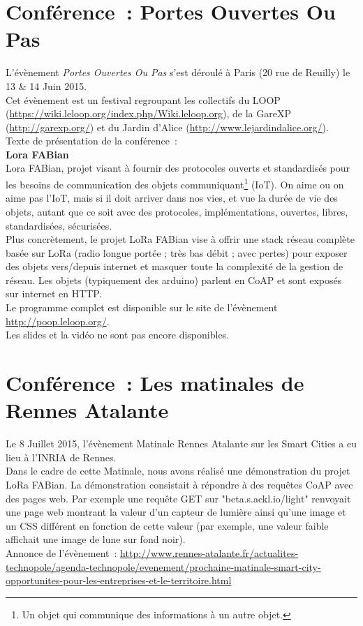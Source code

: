 \documentclass{article}
\begin{document}
	\section{Conférence~: Portes Ouvertes Ou Pas}
L'évènement \emph{Portes Ouvertes Ou Pas} s'est déroulé à Paris (20 rue de Reuilly) le 13 \& 14 Juin 2015.\\
Cet évènement est un festival regroupant les collectifs du LOOP (\url{https://wiki.leloop.org/index.php/Wiki.leloop.org}), de la GareXP (\url{http://garexp.org/}) et du Jardin d'Alice (\url{http://www.lejardindalice.org/}).\\
Texte de présentation de la conférence~:\\
\textbf{Lora FABian}\\
    Lora FABian, projet visant à fournir des protocoles ouverts et standardisés pour les besoins de communication des objets communiquant\footnote{Un objet qui communique des informations à un autre objet.} (IoT). On aime ou on aime pas l'IoT, mais si il doit arriver dans nos vies, et vue la durée de vie des objets, autant que ce soit avec des protocoles, implémentations, ouvertes, libres, standardisées, sécurisées.\\
    Plus concrètement, le projet LoRa FABian vise à offrir une stack réseau complète basée sur LoRa (radio longue portée ; très bas débit ; avec pertes) pour exposer des objets vers/depuis internet et masquer toute la complexité de la gestion de réseau. Les objets (typiquement des arduino) parlent en CoAP et sont exposés sur internet en HTTP.\\
Le programme complet est disponible sur le site de l'évènement \url{http://poop.leloop.org/}.\\
Les slides et la vidéo ne sont pas encore disponibles.
	\section{Conférence~: Les matinales de Rennes Atalante}
Le 8 Juillet 2015, l'évènement Matinale Rennes Atalante sur les Smart Cities a eu lieu à l'\textsc{INRIA} de Rennes.\\
Dans le cadre de cette Matinale, nous avons réalisé une démonstration du projet LoRa FABian. La démonstration consistait à répondre à des requêtes CoAP avec des pages web. Par exemple une requête GET sur "beta.s.ackl.io/light" renvoyait une page web montrant la valeur d'un capteur de lumière ainsi qu'une image et un CSS différent en fonction de cette valeur (par exemple, une valeur faible affichait une image de lune sur fond noir).\\
Annonce de l'évènement~: \url{http://www.rennes-atalante.fr/actualites-technopole/agenda-technopole/evenement/prochaine-matinale-smart-city-opportunites-pour-les-entreprises-et-le-territoire.html}
\end{document}
